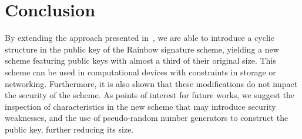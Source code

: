 \documentclass[11pt]{article}
\begin{document}
\section{Conclusion}\label{sec:conclusion}

By extending the approach presented in~\cite{Petzoldt:inproc:2010:jun}, we are
able to introduce a cyclic structure in the public key of the Rainbow signature
scheme, yielding a new scheme featuring public keys with almost a third of
their original size. This scheme can be used in computational devices with
constraints in storage or networking. Furthermore, it is also shown that these
modifications do not impact the security of the scheme. As points of interest
for future works, we suggest the inspection of characteristics in the new
scheme that may introduce security weaknesses, and the use of pseudo-random
number generators to construct the public key, further reducing its size.



\end{document}
